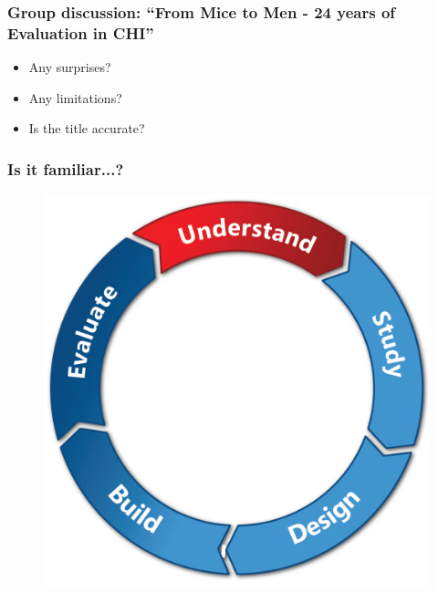 \documentclass[screen, aspectratio=43]{beamer}
\begin{document}
%
\begin{frame}
\frametitle{Group discussion: ``From Mice to Men - 24 years of Evaluation in CHI''}
\begin{itemize}
\item Any surprises? 
\item Any limitations? 
\item Is the title accurate?
\end{itemize}
\end{frame}
%
\begin{frame}
\frametitle{Is it familiar...?}
\begin{figure}
\includegraphics[scale=0.20]{img/design-cycle.pdf}
\end{figure}
\end{frame}
%
\end{document}
